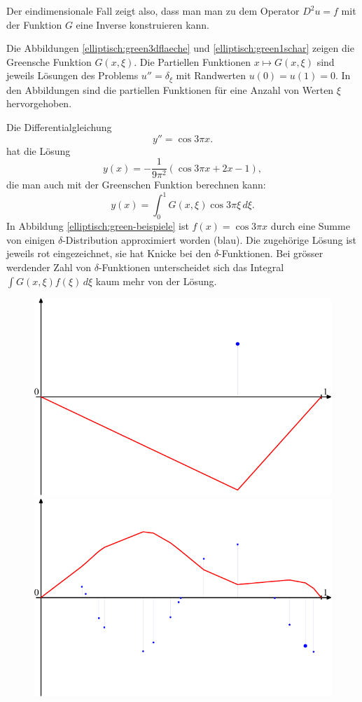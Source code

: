 Der eindimensionale Fall zeigt also, dass man man zu dem Operator $D^2u=f$
mit der Funktion $G$ eine Inverse konstruieren kann.

Die Abbildungen \ref{elliptisch:green3dflaeche} und
\ref{elliptisch:green1schar} zeigen die Greensche Funktion $G(x,\xi)$.
Die Partiellen Funktionen $x\mapsto G(x,\xi)$ sind jeweils Lösungen
des Problems $u''=\delta_\xi$ mit Randwerten $u(0)=u(1)=0$.
In den Abbildungen sind die partiellen Funktionen für eine Anzahl
von Werten $\xi$ hervorgehoben.

\begin{beispiel}
Die Differentialgleichung
\[
y''=\cos 3\pi x.
\]
hat die Lösung
\[
y(x)=-\frac1{9\pi^2}(\cos 3\pi x + 2x - 1),
\]
die man auch mit der Greenschen Funktion berechnen kann:
\[
y(x)=\int_0^1 G(x,\xi)\cos 3\pi\xi\,d\xi.
\]
In Abbildung
\ref{elliptisch:green-beispiele}
ist $f(x)=\cos 3\pi x$ durch eine Summe von einigen $\delta$-Distribution
approximiert worden (blau).
Die zugehörige Lösung ist jeweils rot eingezeichnet, sie hat
Knicke bei den $\delta$-Funktionen. 
Bei grösser werdender Zahl von $\delta$-Funktionen unterscheidet sich
das Integral $\int G(x,\xi)f(\xi)\,d\xi$ kaum mehr von der Lösung.
\begin{figure}
\begin{center}
\includegraphics[width=0.7\hsize]{graphics/green-1.pdf}\\
\includegraphics[width=0.7\hsize]{graphics/green-324.pdf}\\

\end{center}
\end{figure}
\end{beispiel}
